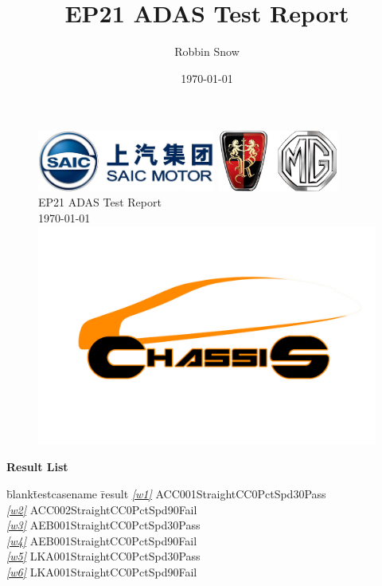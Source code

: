 \documentclass[12pt]{report}
\title{EP21 ADAS Test Report}
\author{Robbin Snow}
\date{\today}
\begin{document}
 
\begin{titlepage} 
\begin{figure}[h] 
\includegraphics[height=2cm]{SAICLogo}\hfill 
\includegraphics[height=2cm]{RMGLogo}\\ 
\vskip 3cm 
\centering\Huge{EP21 ADAS Test Report}\\ 
\vskip 0.5cm 
\centering\Huge{\today} 
\vskip 4cm 
\includegraphics[width=0.55\linewidth]{CHLogo} 
\end{figure} 
\end{titlepage} 
\centerline{\Large{\textbf{Result List}}} 
\begin{CJK}{GBK}{kai} 
\begin{tabbing} 
\hspace*{30bp}\=blank\hspace*{30bp}\=testcasename\hspace*{200bp} \=result\kill 
\>\textit{\underline{\ref{w1}}} \>ACC001StraightCC0PctSpd30\>Pass\\ 
\>\textit{\underline{\ref{w2}}} \>ACC002StraightCC0PctSpd90\>\textcolor[rgb]{1,0,0}{Fail}\\ 
\>\textit{\underline{\ref{w3}}} \>AEB001StraightCC0PctSpd30\>Pass\\ 
\>\textit{\underline{\ref{w4}}} \>AEB001StraightCC0PctSpd90\>\textcolor[rgb]{1,0,0}{Fail}\\ 
\>\textit{\underline{\ref{w5}}} \>LKA001StraightCC0PctSpd30\>Pass\\ 
\>\textit{\underline{\ref{w6}}} \>LKA001StraightCC0PctSpd90\>\textcolor[rgb]{1,0,0}{Fail}\\ 
\end{tabbing} 
\end{CJK} 
\end{document}
